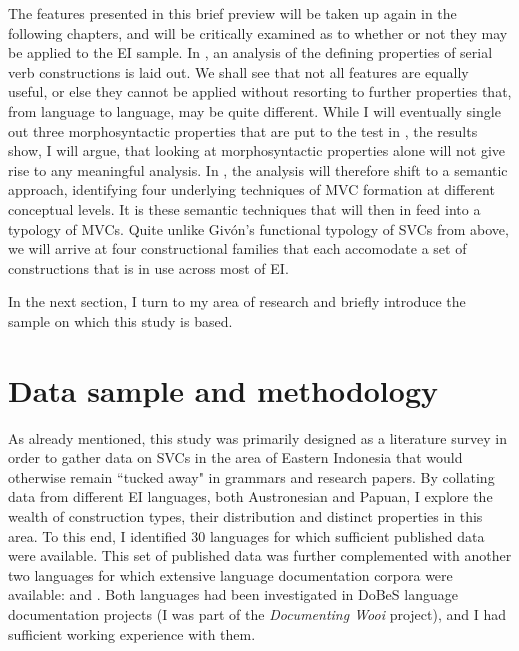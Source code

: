 The features presented in this brief preview will be taken up again in the following chapters, and will be critically examined as to whether or not they may be applied to the EI sample. In , an analysis of the defining properties of serial verb constructions is laid out. We shall see that not all features are equally useful, or else they cannot be applied without resorting to further properties that, from language to language, may be quite different. While I will eventually single out three morphosyntactic properties that are put to the test in , the results  show, I will argue, that looking at morphosyntactic properties alone will not give rise to any meaningful analysis. In , the analysis will therefore shift to a semantic approach, identifying four underlying techniques of MVC formation at different conceptual levels. It is these semantic techniques that will then in  feed into a typology of MVCs. Quite unlike Givón's functional typology of SVCs from above, we will arrive at four constructional families that each accomodate a set of constructions that is in use across most of EI.

In the next section, I turn to my area of research and briefly introduce the sample on which this study is based.

\section{Data sample and methodology}\label{sec:data}

As already mentioned, this study was primarily designed as a literature survey in order to gather data on SVCs in the area of Eastern Indonesia that would otherwise remain ``tucked away" in grammars and research papers. By collating data from different EI languages, both Austronesian and Papuan, I explore the wealth of construction types, their distribution and distinct properties in this area. To this end, I identified 30 languages for which sufficient published data were available. This set of published data was further complemented with another two languages for which extensive language documentation corpora were available:  and . Both languages had been investigated in DoBeS language documentation projects (I was part of the \textit{Documenting Wooi} project), and I had sufficient working experience with them. 


